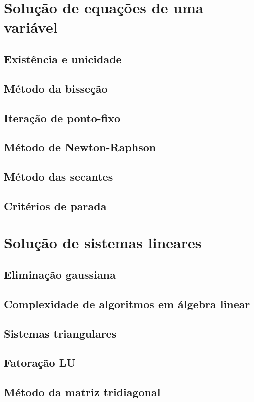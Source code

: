 \documentclass[12pt]{article}
\theoremstyle{plain}
\theoremstyle{definition}
\theoremstyle{remark}
\begin{document}
\section{Solução de equações de uma variável}

\subsection{Existência e unicidade}
\subsection{Método da bisseção}
\subsection{Iteração de ponto-fixo}
\subsection{Método de Newton-Raphson}
\subsection{Método das secantes}
\subsection{Critérios de parada}

\section{Solução de sistemas lineares}

\subsection{Eliminação gaussiana}
\subsection{Complexidade de algoritmos em álgebra linear}
\subsection{Sistemas triangulares}
\subsection{Fatoração LU}
\subsection{Método da matriz tridiagonal}
\end{document}
